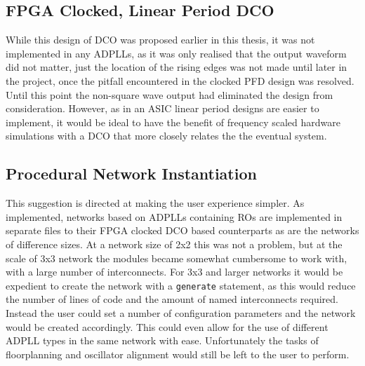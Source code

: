 \subsection{\acs{FPGA} Clocked, Linear Period \acs{DCO}}
While this design of \ac{DCO} was proposed earlier in this thesis, it was not implemented in any \ac{ADPLL}s, as it was only realised that the output waveform did not matter, just the location of the rising edges was not made until later in the project, once the pitfall encountered in the clocked \ac{PFD} design was resolved. Until this point the non-square wave output had eliminated the design from consideration. However, as in an \ac{ASIC} linear period designs are easier to implement, it would be ideal to have the benefit of frequency scaled hardware simulations with a \ac{DCO} that more closely relates the the eventual system.

\subsection{Procedural Network Instantiation}
This suggestion is directed at making the user experience simpler. As implemented, networks based on \ac{ADPLL}s containing \ac{RO}s are implemented in separate files to their \ac{FPGA} clocked \ac{DCO} based counterparts as are the networks of difference sizes. At a network size of 2x2 this was not a problem, but at the scale of 3x3 network the modules became somewhat cumbersome to work with, with a large number of interconnects. For 3x3 and larger networks it would be expedient to create the network with a \texttt{generate} statement, as this would reduce the number of lines of code and the amount of named interconnects required. Instead the user could set a number of configuration parameters and the network would be created accordingly. This could even allow for the use of different \ac{ADPLL} types in the same network with ease. Unfortunately the tasks of floorplanning and oscillator alignment would still be left to the user to perform.


